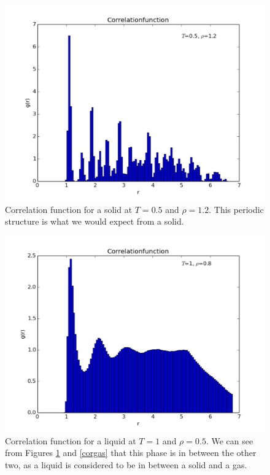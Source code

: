 \documentclass{article}
\begin{document}
\begin{multicols}{2}
\begin{figure}[H]
\begin{center}
\includegraphics[width=\linewidth]{plots/correlationfunctionT05rho12x.pdf}
\caption{Correlation function for a solid at $T=0.5$ and $\rho=1.2$.  This periodic structure is what we would expect from a solid.}
\label{corsolid}
\end{center}
\end{figure}

\begin{figure}[H]
\begin{center}
\includegraphics[width=\linewidth]{plots/corfunct1rho08n864lp500.pdf}
\caption{Correlation function for a liquid at $T=1$ and $\rho=0.5$.  We can see from Figures \ref{corsolid} and \ref{corgas} that this phase is in between the other two, as a liquid is considered to be in between a solid and a gas.}
\label{corliquid}
\end{center}
\end{figure}


\end{multicols}
\end{document}
